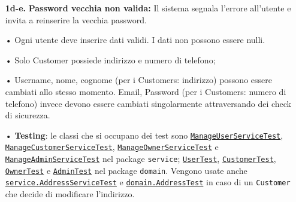 {\begin{enumerate}[nosep, leftmargin=29px]
		\begin{enumerate}[nosep, leftmargin=1px]
			\item[i.] L'utente naviga su "Cambia password"; 
			\item[ii.] Il sistema mostra una pagina dedicata per il cambio password;
			\item[iii.] L'utente inserisce la nuova e la vecchia password;
			\item[iv.] Il sistema verifica la password vecchia;
			\item[v.] Il sistema aggiorna la password nel database e mostra un messaggio di conferma all'utente.
		\end{enumerate}
		\item[\textbf{1d-e.}] \textbf{Password vecchia non valida:} Il sistema segnala l'errore all'utente e invita a reinserire la vecchia password.
	\end{enumerate}
}
{
	\begin{enumerate}[nosep, leftmargin=*]
		\item[•] Ogni utente deve inserire dati validi. I dati non possono essere nulli.
		\item[•] Solo Customer possiede indirizzo e numero di telefono;
		\item[•] Username, nome, cognome (per i Customers: indirizzo) possono essere cambiati allo stesso momento. Email, Password (per i Customers: numero di telefono) invece devono essere cambiati singolarmente attraversando dei check di sicurezza.
	\end{enumerate}
	
	
	\begin{enumerate}[leftmargin=*]
		\item[•] \textbf{Testing}: le classi che si occupano dei test sono \hyperref[itm:application_user]{\texttt{ManageUserServiceTest}}, \hyperref[itm:application_user]{\texttt{ManageCustomerServiceTest}}, \hyperref[itm:application_user]{\texttt{ManageOwnerServiceTest}} e \hyperref[itm:application_user]{\texttt{ManageAdminServiceTest}} nel package \texttt{service}; \hyperref[itm:domain_user]{\texttt{UserTest}}, \hyperref[itm:domain_user]{\texttt{CustomerTest}}, \hyperref[itm:domain_user]{\texttt{OwnerTest}} e \hyperref[itm:domain_user]{\texttt{AdminTest}} nel package \texttt{domain}. \newline Vengono usate anche \hyperref[itm:application_common]{\texttt{service.AddressServiceTest}} e \hyperref[itm:domain_beachsubclasses]{\texttt{domain.AddressTest}} in caso di un \texttt{Customer} che decide di modificare l'indirizzo.
	\end{enumerate}
}